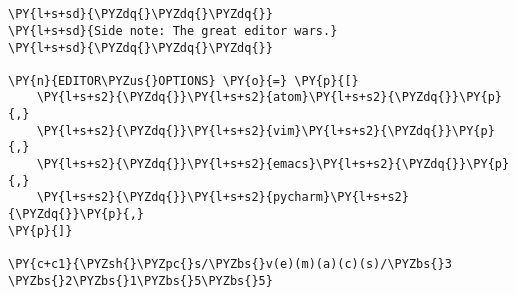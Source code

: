 

\section*{}

\begin{Verbatim}[commandchars=\\\{\}]
\PY{l+s+sd}{\PYZdq{}\PYZdq{}\PYZdq{}}
\PY{l+s+sd}{Side note: The great editor wars.}
\PY{l+s+sd}{\PYZdq{}\PYZdq{}\PYZdq{}}

\PY{n}{EDITOR\PYZus{}OPTIONS} \PY{o}{=} \PY{p}{[}
    \PY{l+s+s2}{\PYZdq{}}\PY{l+s+s2}{atom}\PY{l+s+s2}{\PYZdq{}}\PY{p}{,}
    \PY{l+s+s2}{\PYZdq{}}\PY{l+s+s2}{vim}\PY{l+s+s2}{\PYZdq{}}\PY{p}{,}
    \PY{l+s+s2}{\PYZdq{}}\PY{l+s+s2}{emacs}\PY{l+s+s2}{\PYZdq{}}\PY{p}{,}
    \PY{l+s+s2}{\PYZdq{}}\PY{l+s+s2}{pycharm}\PY{l+s+s2}{\PYZdq{}}\PY{p}{,}
\PY{p}{]}

\PY{c+c1}{\PYZsh{}\PYZpc{}s/\PYZbs{}v(e)(m)(a)(c)(s)/\PYZbs{}3 \PYZbs{}2\PYZbs{}1\PYZbs{}5\PYZbs{}5}
\end{Verbatim}

